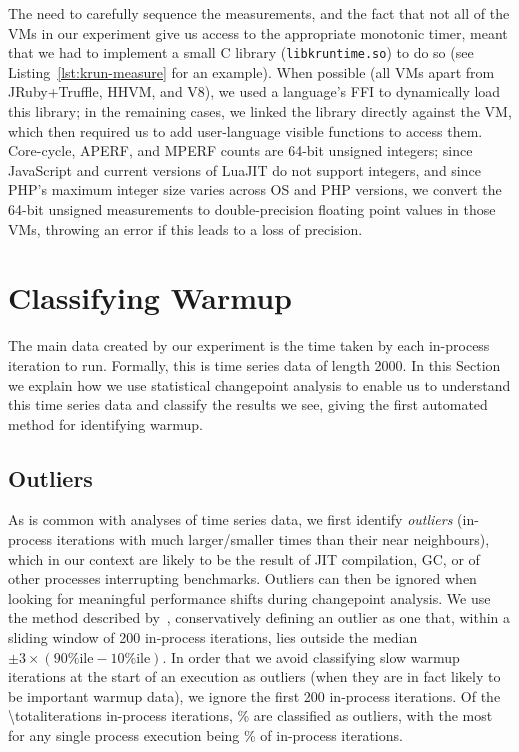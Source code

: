 \documentclass[acmsmall,screen]{acmart}
\newcommand{\numiterations}{2000\xspace}
\begin{document}
The need to carefully sequence the measurements, and the fact that not all of
the VMs in our experiment give us access to the appropriate monotonic timer,
meant that we had to implement a small C library (\texttt{libkruntime.so}) to do so
(see Listing~\ref{lst:krun-measure} for an example). When possible
(all VMs apart from JRuby+Truffle, HHVM, and V8), we used a language's FFI to dynamically load this library;
in the remaining cases, we linked the library directly against the VM, which
then required us to add user-language visible functions to access them.
Core-cycle, APERF, and MPERF counts are 64-bit unsigned integers; since
JavaScript and current versions of LuaJIT do not support
integers, and since PHP's maximum integer size varies across OS and PHP versions, we
convert the 64-bit unsigned measurements to
double-precision floating point values in those VMs, throwing an error if this leads to a
loss of precision.


\section{Classifying Warmup}
\label{sec:stats}

The main data created by our experiment is the time taken by each in-process
iteration to run. Formally, this is time series data of length \numiterations. In
this Section we explain how we use statistical changepoint analysis to enable us to
understand this time series data and classify the results we see, giving the
first automated method for identifying warmup.


\subsection{Outliers}

As is common with analyses of time series data, we first identify
\emph{outliers} (in-process iterations with much larger/smaller times than their near
neighbours), which in our context are likely to be the result of JIT compilation,
GC, or of other processes interrupting benchmarks. Outliers can then be ignored
when looking for meaningful performance shifts during changepoint analysis. We use the method described
by~\citet{tukey1977exploratory}, conservatively defining an outlier as one that, within a
sliding window of 200 in-process iterations, lies outside the median $\pm
3\times(90\%\textrm{ile} - 10\%\textrm{ile})$. In order that we avoid classifying
slow warmup iterations at the start of an execution as outliers (when they are
in fact likely to be important warmup data), we ignore the first 200 in-process
iterations. Of the \num{\totaliterations}\xspace in-process
iterations, \totaloutlierspercentage\% are classified as outliers, with the most for
%
any single process execution being \result\% of in-process iterations.
\end{document}
